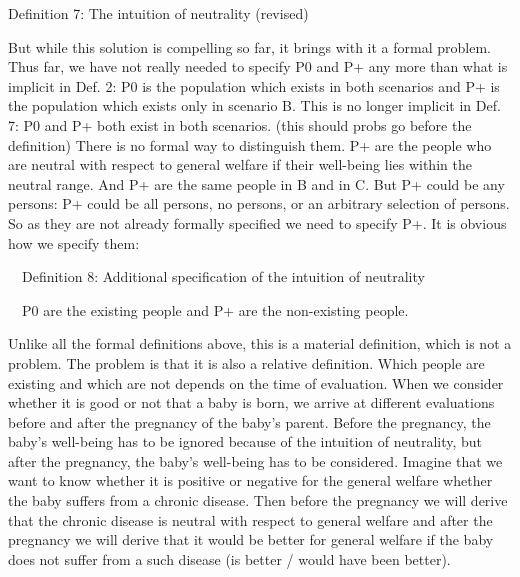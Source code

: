 Definition 7: The intuition of neutrality (revised) 
\begin{comment}
${\exists}$u1, u2: ( ${\forall}$ x ${\in}$ P+ : uB(x) ${\in}$ [u1, u2] ) \ding{213} 

( uB(P0) {\textgreater} uA(P0) \ \ \ding{213} \ \ uB(P0 ${\cup}$ P+) {\textgreater} uA(P0 ${\cup}$ P+) ) ${\wedge}$  

( uB(P0) {\textless} uA(P0) \ \ \ding{213} \ \ uB(P0 ${\cup}$ P+) {\textless} uA(P0 ${\cup}$ P+) ) 
\end{comment}

But while this solution is compelling so far, it brings with it a formal problem. Thus far, we have not really needed to specify P0 and P+ any more than what is implicit in Def. 2: P0 is the population which exists in both scenarios and P+ is the population which exists only in scenario B. This is no longer implicit in Def. 7: P0 and P+ both exist in both scenarios. (this should probs go before the definition) There is no formal way to distinguish them. P+ are the people who are neutral with respect to general welfare if their well-being lies within the neutral range. And P+ are the same people in B and in C. But P+ could be any persons: P+ could be all persons, no persons, or an arbitrary selection of persons. So as they are not already formally specified we need to specify P+. It is obvious how we specify them:  

\ \ Definition 8: Additional specification of the intuition of neutrality 

\ \ P0 are the existing people and P+ are the non-existing people.  

Unlike all the formal definitions above, this is a material definition, which is not a problem. The problem is that it is also a relative definition. Which people are existing and which are not depends on the time of evaluation. When we consider whether it is good or not that a baby is born, we arrive at different evaluations before and after the pregnancy of the baby’s parent. Before the pregnancy, the baby’s well-being has to be ignored because of the intuition of neutrality, but after the pregnancy, the baby’s well-being has to be considered. Imagine that we want to know whether it is positive or negative for the general welfare whether the baby suffers from a chronic disease. Then before the pregnancy we will derive that the chronic disease is neutral with respect to general welfare and after the pregnancy we will derive that it would be better for general welfare if the baby does not suffer from a such disease (is better / would have been better).  

